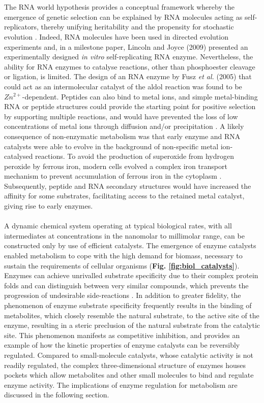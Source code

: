 %
%
\\\\
%
%
The RNA world hypothesis provides a conceptual framework whereby the emergence of genetic selection can be explained by RNA molecules acting as self-replicators, thereby unifying heritability and the propensity for stochastic evolution \cite{Orgel:2004aa}. Indeed, RNA molecules have been used in directed evolution experiments and, in a milestone paper, Lincoln and Joyce (2009) \cite{Lincoln:2009aa} presented an experimentally designed \textit{in vitro} self-replicating RNA enzyme. Nevertheless, the ability for RNA enzymes to catalyse reactions, other than phosphoester cleavage or ligation, is limited. The design of an RNA enzyme by Fusz \textit{et al.} (2005) \cite{Fusz:2005aa} that could act as an intermolecular catalyst of the aldol reaction was found to be $Zn^{2+}$-dependent. Peptides can also bind to metal ions, and simple metal-binding RNA or peptide structures could provide the starting point for positive selection by supporting multiple reactions, and would have prevented the loss of low concentrations of metal ions through diffusion and/or precipitation \cite{Ralser:2014aa}. A likely consequence of non-enzymatic metabolism was that early enzyme and RNA catalysts were able to evolve in the background of non-specific metal ion-catalysed reactions. To avoid the production of superoxide from hydrogen peroxide by ferrous iron, modern cells evolved a complex iron transport mechanism to prevent accumulation of ferrous iron in the cytoplasm \cite{aisen1980iron}. Subsequently, peptide and RNA secondary structures would have increased the affinity for some substrates, facilitating access to the retained metal catalyst, giving rise to early enzymes. 
%
%
\\\\
%
%
A dynamic chemical system operating at typical biological rates, with all intermediates at concentrations in the nanomolar to millimolar range, can be constructed only by use of efficient catalysts. The emergence of enzyme catalysts enabled metabolism to cope with the high demand for biomass, necessary to sustain the requirements of cellular organisms (\textbf{Fig. \ref{fig:biol_catalysts}}). Enzymes can achieve unrivalled substrate specificity due to their complex protein folds and can distinguish between very similar compounds, which prevents the progression of undesirable side-reactions \cite{Ralser:2014aa}. In addition to greater fidelity, the phenomenon of enzyme substrate specificity frequently results in the binding of metabolites, which closely resemble the natural substrate, to the active site of the enzyme, resulting in a steric preclusion of the natural substrate from the catalytic site. This phenomenon manifests as competitive inhibition, and provides an example of how the kinetic properties of enzyme catalysts can be reversibly regulated. Compared to small-molecule catalysts, whose catalytic activity is not readily regulated, the complex three-dimensional structure of enzymes houses pockets which allow metabolites and other small molecules to bind and regulate enzyme activity. The implications of enzyme regulation for metabolism are discussed in the following section. 
